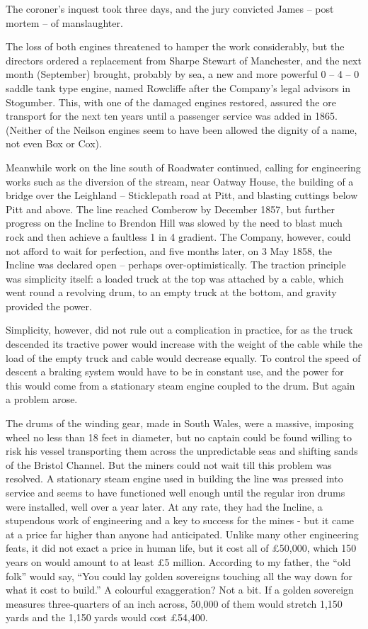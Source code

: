 \documentclass[10pt,a4paper]{article}
\begin{document}
The coroner’s inquest took three days, and the jury convicted James – post mortem – of manslaughter.

The loss of both engines threatened to hamper the work considerably,  but the directors ordered a replacement from Sharpe Stewart of Manchester, and the next month (September) brought, probably by sea, a new and more powerful 0 – 4 – 0  saddle tank type engine, named Rowcliffe  after the Company’s legal advisors in Stogumber.  This, with one of the damaged engines restored, assured the ore transport for the next ten years until a passenger service was added in 1865. (Neither of the Neilson engines seem to have been allowed the dignity of a name, not even Box or Cox). 

Meanwhile work on the line south of Roadwater continued, calling for engineering works such as the diversion of the stream, near Oatway House, the building of a bridge over the Leighland – Sticklepath road at Pitt, and blasting cuttings below Pitt and above. The line reached Comberow by December 1857, but further progress on the Incline to Brendon Hill was slowed by the need to blast much rock and then  achieve a faultless 1 in 4 gradient. The Company, however, could not afford to wait for perfection, and five months later, on 3 May 1858, the Incline was declared open – perhaps over-optimistically. The traction principle was simplicity itself: a loaded truck at the top was attached by a cable, which went round a revolving drum, to an empty truck at the bottom, and gravity provided the power.

Simplicity, however, did not rule out a complication in practice, for as the truck descended its tractive power would increase with the weight of the cable while the load of the empty truck and cable would decrease equally. To control the speed of descent a braking system would have to be in constant use, and the power for this would come from a stationary steam engine coupled to the drum. But again a problem arose.

The drums of the winding gear, made in South Wales, were a massive, imposing wheel no less than 18 feet in diameter, but no captain could be found willing to risk his vessel transporting them across the unpredictable seas and shifting sands of the Bristol Channel. But the miners could not wait till this problem was resolved. A stationary steam engine used in building the line was pressed into service and seems to have functioned well enough until the regular iron drums were installed, well over a year later. At any rate, they had the Incline, a stupendous work of engineering and a key to success for the mines - but it came at a price far higher than anyone had anticipated. Unlike many other engineering feats, it did not exact a price in human life, but it cost all of £50,000, which 150 years on would amount to at least £5 million.  According to my father, the “old folk” would say, “You could lay golden sovereigns touching all the way down for what it cost to build.” A colourful exaggeration? Not a bit. If a golden sovereign measures three-quarters of an inch across, 50,000 of them would stretch 1,150 yards and the 1,150 yards would cost £54,400.
\end{document}
